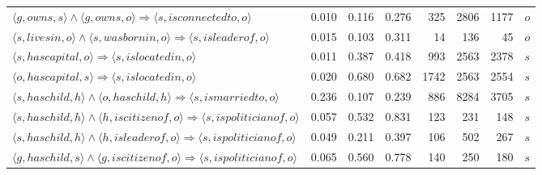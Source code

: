 \begin{tabular}{lrrrrrrl}
                 $\langle g, owns, s \rangle \wedge \langle g, owns, o \rangle \Rightarrow \langle s, isconnectedto , o \rangle$ &          0.010 &              0.116 &              0.276 &                             325 &                        2806 &                            1177 &        $o$ \\
            $\langle s, livesin, o \rangle \wedge \langle s, wasbornin, o \rangle \Rightarrow \langle s, isleaderof , o \rangle$ &          0.015 &              0.103 &              0.311 &                              14 &                         136 &                              45 &        $o$ \\
                                               $\langle s, hascapital, o \rangle \Rightarrow \langle s, islocatedin , o \rangle$ &          0.011 &              0.387 &              0.418 &                             993 &                        2563 &                            2378 &        $s$ \\
                                               $\langle o, hascapital, s \rangle \Rightarrow \langle s, islocatedin , o \rangle$ &          0.020 &              0.680 &              0.682 &                            1742 &                        2563 &                            2554 &        $s$ \\
           $\langle s, haschild, h \rangle \wedge \langle o, haschild, h \rangle \Rightarrow \langle s, ismarriedto , o \rangle$ &          0.236 &              0.107 &              0.239 &                             886 &                        8284 &                            3705 &        $s$ \\
     $\langle s, haschild, h \rangle \wedge \langle h, iscitizenof, o \rangle \Rightarrow \langle s, ispoliticianof , o \rangle$ &          0.057 &              0.532 &              0.831 &                             123 &                         231 &                             148 &        $s$ \\
      $\langle s, haschild, h \rangle \wedge \langle h, isleaderof, o \rangle \Rightarrow \langle s, ispoliticianof , o \rangle$ &          0.049 &              0.211 &              0.397 &                             106 &                         502 &                             267 &        $s$ \\
     $\langle g, haschild, s \rangle \wedge \langle g, iscitizenof, o \rangle \Rightarrow \langle s, ispoliticianof , o \rangle$ &          0.065 &              0.560 &              0.778 &                             140 &                         250 &                             180 &        $s$ \\

\end{tabular}
